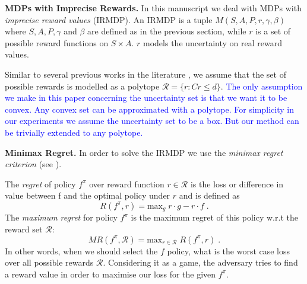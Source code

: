 \documentclass[sigconf]{aamas}  %
\newcommand{\ET}[1]{{\textcolor{blue}{#1}}}
\begin{document}
\textbf{MDPs with Imprecise Rewards.}  
In this manuscript we deal with 
MDPs with \textit{imprecise reward values} (IRMDP). An IRMDP \citep{Regan2009} is a tuple $M(S, A, P, r, \gamma, \beta)$ where $S, A, P, \gamma$ and $\beta$ are defined as in the previous section, while $r$ is a set of possible reward functions on $S \times A$. $r$ models the uncertainty on real reward values. 

Similar to several previous works in the literature \cite{Ahmed2017,alizadeh2015,benavent2018,Regan2009,Weng2013}, we assume that the set of possible rewards is modelled as a polytope $\mathcal{R} = \{r: Cr \leq d \}$. \ET{The only assumption we make in this paper concerning the uncertainty set is that we want it to be convex. Any convex set can be approximated with a polytope. For simplicity in our experiments we assume the uncertainty set to be a box. But our method can be trivially extended to any polytope. }
 

\textbf{Minimax Regret.}  
In order to solve the IRMDP we use the \textit{minimax regret criterion} (see \cite{Regan2009,Xu2009}). 

The \textit{regret} of policy $f^{\pi}$ 
over reward function $r \in \mathcal{R}$ is the loss or difference in value between f and the optimal policy under $r$ and is defined as 
$$R(f^{\pi}, r) = \text{max}_{g} \; r \cdot g - r \cdot f\;.$$
The \textit{maximum regret} for policy $f^{\pi}$ is the maximum regret of this policy w.r.t the reward set 
$\mathcal{R}$: $$MR(f^{\pi}, \mathcal{R}) = \text{max}_{r \in \mathcal{R}}\;R(f^{\pi},r)\;.$$ 
In other words, when we should select the $f$ policy, what is the worst case loss over all possible rewards $\mathcal{R}$. Considering it as a game, the adversary tries to find a reward value in order to maximise our loss for the given $f^{\pi}$.  
\end{document}
